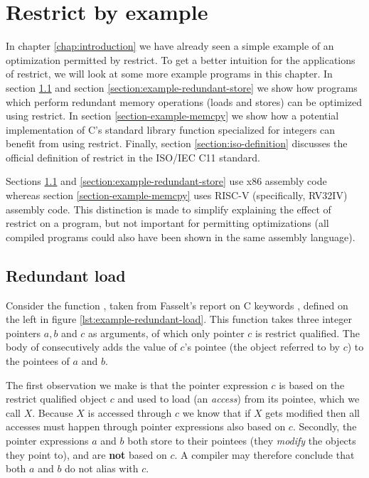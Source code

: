 \chapter{Restrict by example}\label{chapter:examples}
In chapter \ref{chap:introduction} we have already seen a simple example of an optimization permitted by restrict.
To get a better intuition for the applications of restrict, we will look at some more example programs in this chapter.
In section \ref{section:example-redundant-load} and section \ref{section:example-redundant-store} we show how programs which
perform redundant memory operations (loads and stores) can be optimized using restrict.
In section \ref{section-example-memcpy} we show how a potential implementation of C's standard library function
 specialized for integers can benefit from using restrict.
Finally, section \ref{section:iso-definition} discusses the official definition of restrict in
the ISO/IEC C11 standard.

Sections \ref{section:example-redundant-load} and \ref{section:example-redundant-store} use
x86 assembly code whereas section \ref{section-example-memcpy} uses RISC-V (specifically, RV32IV) assembly code.
This distinction is made to simplify explaining the effect of restrict on a program,
but not important for permitting optimizations (\ie all compiled programs could also have been shown
in the same assembly language).

\section{Redundant load}\label{section:example-redundant-load}
Consider the function , taken from Fasselt's report on C keywords \cite{fasselt2014keywords},
defined on the left in figure \ref{lst:example-redundant-load}.
This function takes three integer pointers $a, b$ and $c$ as arguments, of which only pointer $c$ is restrict qualified.
The body of  consecutively adds the value of $c$'s pointee (the object referred to by $c$) to the pointees of $a$ and $b$.    

The first observation we make is that the pointer expression $c$ is based on the restrict qualified object $c$ and used to load (\ie an \textit{access}) from its pointee, which we call $X$.
Because $X$ is accessed through $c$ we know that if $X$ gets modified then all accesses must happen through pointer expressions also based on $c$.
Secondly, the pointer expressions $a$ and $b$ both store to their pointees (\ie they \textit{modify} the objects they point to), and are \textbf{not} based on $c$.
A compiler may therefore conclude that both $a$ and $b$ do not alias with $c$.

